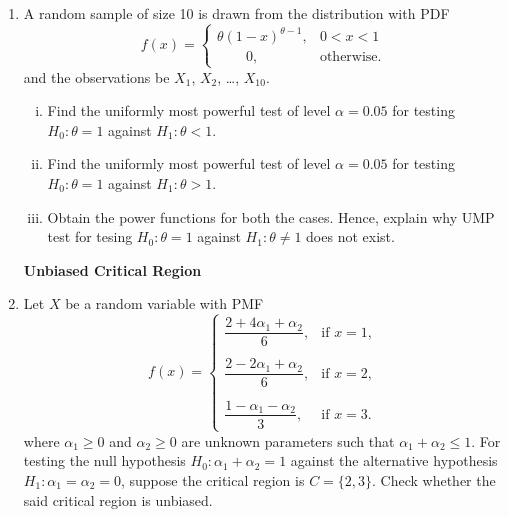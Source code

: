 \documentclass[11pt, a4paper]{article}
\begin{document}
\begin{enumerate}
	\item A random sample of size 10 is drawn from the distribution with PDF 
	\begin{equation*}
	f(x) = 
		\begin{cases}
		\theta \left( 1 - x \right)^{\theta - 1}, & 0 < x < 1 \\
		\hspace{25pt} 0, & \text{otherwise.}
		\end{cases}	
	\end{equation*}
	and the observations be $X_1$, $X_2$, \ldots, $X_{10}$.
	\begin{enumerate}[(i)]
	\item Find the uniformly most powerful test of level $\alpha = 0.05$ for testing $H_0 : \theta = 1$ against $H_1 : \theta < 1$.
	\item Find the uniformly most powerful test of level $\alpha = 0.05$ for testing $H_0 : \theta = 1$ against $H_1 : \theta > 1$.
	\item Obtain the power functions for both the cases. Hence, explain why UMP test for tesing $H_0 : \theta = 1$ against $H_1 : \theta \neq 1$ does not exist.
	\end{enumerate}
	
	
	
	
	
	

\newpage

\begin{center}

\textbf{\huge Unbiased Critical Region}

\end{center}


\vspace{50pt}	
	
	
	
	
	
	
	\item Let $X$ be a random variable with PMF
	\begin{equation*}
	f(x) = 
		\begin{cases}
		\dfrac{2+4\alpha_1+\alpha_2}{6}, & \text{if } x = 1, \\ \\
		\dfrac{2-2\alpha_1+\alpha_2}{6}, & \text{if } x = 2, \\ \\
		\dfrac{1-\alpha_1-\alpha_2}{3}, & \text{if } x = 3.
		\end{cases}
	\end{equation*}
	where $\alpha_1 \geq 0$ and $\alpha_2 \geq 0$ are unknown parameters such that $\alpha_1 + \alpha_2 \leq 1$. For testing the null hypothesis $H_0 : \alpha_1 + \alpha_2 = 1$ against the alternative hypothesis $H_1 : \alpha_1 = \alpha_2 = 0$, suppose the critical region is $C = \{2, 3\}$. Check whether the said critical region is unbiased.
	

\end{enumerate}
\end{document}
